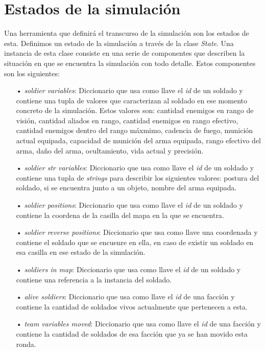 \documentclass[twoside]{article}
\begin{document}
		\section{Estados de la simulaci\'on}
		
		Una herramienta que definir\'a el transcurso de la simulaci\'on son los estados de esta. Definimos un estado de la simulaci\'on a trav\'es de la clase \emph{State}. Una instancia de esta clase consiste en una serie de componentes que describen la situaci\'on en que se encuentra la simulaci\'on con todo detalle. Estos componentes son los siguientes:\\
		
		\begin{itemize}
			\item[•] \emph{soldier variables}: Diccionario que usa como llave el \emph{id} de un soldado y contiene una tupla de valores que caracterizan al soldado en ese momento concreto de la simulaci\'on. Estos valores son: cantidad enemigos en rango de visi\'on, cantidad aliados en rango, cantidad enemigos en rango efectivo, cantidad enemigos dentro del rango m\'axmimo, cadencia de fuego, munici\'on actual equipada, capacidad de munici\'on del arma equipada, rango efectivo del arma, da\~no del arma, ocultamiento, vida actual y precisi\'on.
			\item[•] \emph{soldier str variables}: Diccionario que usa como llave el \emph{id} de un soldado y contiene una tupla de \emph{strings} para describir los siguientes valores: postura del soldado, si se encuentra junto a un objeto, nombre del arma equipada.
			\item[•] \emph{soldier positions}: Diccionario que usa como llave el \emph{id} de un soldado y contiene la coordena de la casilla del mapa en la que se encuentra.
			\item[•] \emph{soldier reverse positions}: Diccionario que usa como llave una coordenada y contiene el soldado que se encuenre en ella, en caso de existir un soldado en esa casilla en ese estado de la simulaci\'on.
			\item[•] \emph{soldiers in map}: Diccionario que usa como llave el \emph{id} de un soldado y contiene una referencia a la instancia del soldado.
			\item[•] \emph{alive soldiers}: Diccionario que usa como llave el \emph{id} de una facci\'on y contiene la cantidad de soldados vivos actualmente que pertenecen a esta.
			\item[•] \emph{team variables moved}: Diccionario que usa como llave el \emph{id} de una facci\'on y contiene la cantidad de soldados de esa facci\'on que ya se han movido esta ronda.

\end{itemize}
\end{document}
